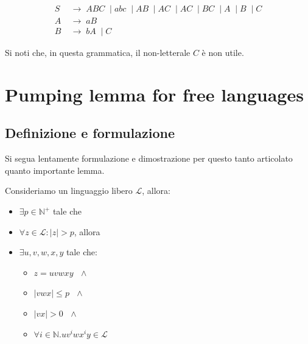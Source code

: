 \documentclass[class=book, crop=false, oneside, 12pt]{standalone}
\begin{document}

\begin{align*}
  S\; & \to\; ABC\; \mid abc\; \mid AB\; \mid AC\; \mid AC\; \mid BC\; \mid A\; \mid B\; \mid C \\
  A\; & \to \; aB \\
  B\; & \to\; bA\; \mid C
\end{align*}

Si noti che, in questa grammatica, il non-letterale \(C\) è non utile.

\section{Pumping lemma for free languages}

\subsection{Definizione e formulazione}

Si segua lentamente formulazione e dimostrazione per questo tanto articolato quanto importante lemma.

\begin{lemma}
  Consideriamo un linguaggio libero \(\mathcal{L}\), allora:
  \begin{itemize}
    \item \(\exists p \in \mathbb{N}^+\) tale che
    \item \(\forall z \in \mathcal{L} : |z| > p\), allora
    \item \(\exists u, v, w, x, y\) tale che:
    \begin{itemize}
      \item \(z = uvwxy \textrm{ } \land\)
      \item \(|vwx| \leq p \textrm{ } \land\)
      \item \(|vx| > 0 \textrm{ }\land\)
      \item \(\forall i \in \mathbb{N}.uv^iwx^iy \in \mathcal{L}\)
    \end{itemize}
  \end{itemize}
\end{lemma}
\end{document}
